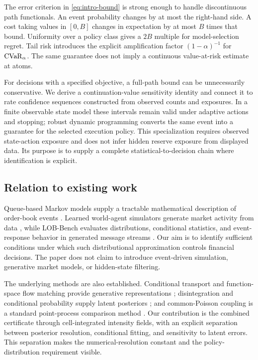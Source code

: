 The error criterion in \eqref{eq:intro-bound} is strong enough to handle discontinuous path functionals. An event probability changes by at most the right-hand side. A cost taking values in $[0,B]$ changes in expectation by at most $B$ times that bound. Uniformity over a policy class gives a $2B$ multiple for model-selection regret. Tail risk introduces the explicit amplification factor $(1-\alpha)^{-1}$ for $\operatorname{CVaR}_\alpha$. The same guarantee does not imply a continuous value-at-risk estimate at atoms.

For decisions with a specified objective, a full-path bound can be unnecessarily conservative. We derive a continuation-value sensitivity identity and connect it to rate confidence sequences constructed from observed counts and exposures. In a finite observable state model these intervals remain valid under adaptive actions and stopping; robust dynamic programming converts the same event into a guarantee for the selected execution policy. This specialization requires observed state-action exposure and does not infer hidden reserve exposure from displayed data. Its purpose is to supply a complete statistical-to-decision chain where identification is explicit.

\subsection{Relation to existing work}
Queue-based Markov models supply a tractable mathematical description of order-book events \citep{cont2010}. Learned world-agent simulators generate market activity from data \citep{coletta2022}, while LOB-Bench evaluates distributions, conditional statistics, and event-response behavior in generated message streams \citep{nagy2025}. Our aim is to identify sufficient conditions under which such distributional approximation controls financial decisions. The paper does not claim to introduce event-driven simulation, generative market models, or hidden-state filtering.

The underlying methods are also established. Conditional transport and function-space flow matching provide generative representations \citep{hosseini2025,kerrigan2024functional}; disintegration and conditional probability supply latent posteriors \citep{kallenberg2021}; and common-Poisson coupling is a standard point-process comparison method \citep{bremaud1981}. Our contribution is the combined certificate through cell-integrated intensity fields, with an explicit separation between posterior resolution, conditional fitting, and sensitivity to latent errors. This separation makes the numerical-resolution constant and the policy-distribution requirement visible.

